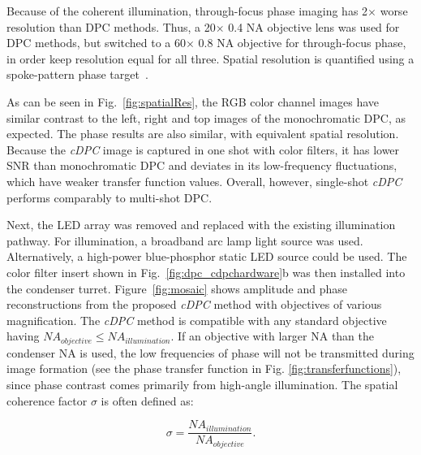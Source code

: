 Because of the coherent illumination, through-focus phase imaging has 2$\times$ worse resolution than DPC methods. Thus, a 20$\times$ 0.4 NA objective lens was used for DPC methods, but switched to a 60$\times$ 0.8 NA objective for through-focus phase, in order keep resolution equal for all three. Spatial resolution is quantified using a spoke-pattern phase target~\cite{standardphaseresolution2016}.

As can be seen in Fig.~\ref{fig:spatialRes}, the RGB color channel images have similar contrast to the left, right and top images of the monochromatic DPC, as expected. The phase results are also similar, with equivalent spatial resolution. Because the \textit{cDPC} image is captured in one shot with color filters, it has lower SNR than monochromatic DPC and deviates in its low-frequency fluctuations, which have weaker transfer function values. Overall, however, single-shot \textit{cDPC} performs comparably to multi-shot DPC.

Next, the LED array was removed and replaced with the existing illumination pathway. For illumination, a broadband arc lamp light source was used. Alternatively, a high-power blue-phosphor static LED source could be used. The color filter insert shown in Fig.~\ref{fig:dpc_cdpchardware}b was then installed into the condenser turret. Figure~\ref{fig:mosaic} shows amplitude and phase reconstructions from the proposed \textit{cDPC} method with objectives of various magnification. The \textit{cDPC} method is compatible with any standard objective having $ NA_{objective}\leq NA_{illumination}$. If an objective with larger NA than the condenser NA is used, the low frequencies of phase will not be transmitted during image formation (see the phase transfer function in Fig. \ref{fig:transferfunctions}), since phase contrast comes primarily from high-angle illumination. The spatial coherence factor $\sigma$ is often defined as:

\begin{equation}
\sigma = \frac{NA_{illumination}}{NA_{objective}}.
\end{equation}

